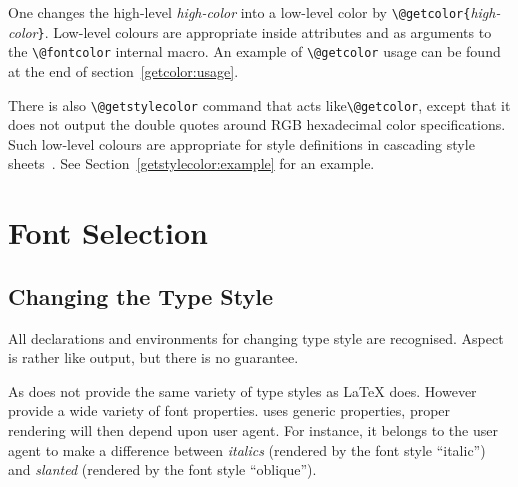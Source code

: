 One changes the high-level \emph{high-color} into a low-level color by
\verb+\@getcolor{+\emph{high-color}\verb+}+.
Low-level colours are appropriate inside \html{} attributes and as
arguments to the \verb+\@fontcolor+ internal macro.
An example of \verb+\@getcolor+ usage can be found at the end of
section~\ref{getcolor:usage}.

There is also \verb+\@getstylecolor+ command that acts
like\verb+\@getcolor+, except that it does not output the double
quotes around RGB hexadecimal color specifications.
Such low-level colours are appropriate for style definitions in
cascading style sheets~\cite{css}. See
Section~\ref{getstylecolor:example} for an example.


\section{Font Selection}

\subsection{Changing the Type Style}\label{type-style}
All \LaTeXe{} declarations and environments for changing type style
are recognised. Aspect is rather like \LaTeXe{} output, but there is
no guarantee.

As \html{} does not provide the same variety of type styles as
\LaTeX{} does.
However \css{} provide a wide variety of font properties.
\hevea{} uses generic properties, proper rendering will then depend
upon user agent.
For instance, it belongs to the user agent
to make a difference between
\textit{italics} (rendered by the font style ``italic'')
and \textsl{slanted} (rendered by the font style ``oblique'').

